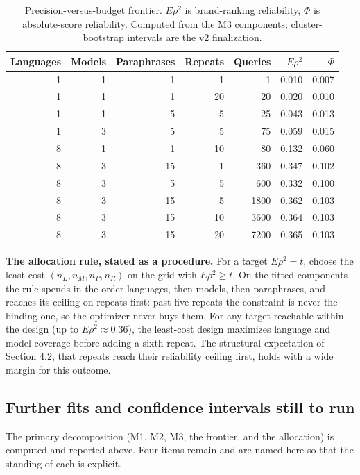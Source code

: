 \documentclass[pdflatex,sn-mathphys-num]{sn-jnl}
\begin{document}
\begin{table}[htbp]
\caption{Precision-versus-budget frontier. $E\rho^2$ is brand-ranking reliability, $\Phi$ is absolute-score reliability. Computed from the M3 components; cluster-bootstrap intervals are the v2 finalization.}
\footnotesize
\begin{tabular*}{\textwidth}{@{\extracolsep{\fill}}rrrrrrr}
\toprule
Languages & Models & Paraphrases & Repeats & Queries & \(E\rho^2\) & \(\Phi\) \\
\midrule

1 & 1 & 1 & 1 & 1 & 0.010 & 0.007 \\
1 & 1 & 1 & 20 & 20 & 0.020 & 0.010 \\
1 & 1 & 5 & 5 & 25 & 0.043 & 0.013 \\
1 & 3 & 5 & 5 & 75 & 0.059 & 0.015 \\
8 & 1 & 1 & 10 & 80 & 0.132 & 0.060 \\
8 & 3 & 15 & 1 & 360 & 0.347 & 0.102 \\
8 & 3 & 5 & 5 & 600 & 0.332 & 0.100 \\
8 & 3 & 15 & 5 & 1800 & 0.362 & 0.103 \\
8 & 3 & 15 & 10 & 3600 & 0.364 & 0.103 \\
8 & 3 & 15 & 20 & 7200 & 0.365 & 0.103 \\
\bottomrule
\end{tabular*}
\end{table}

\textbf{The allocation rule, stated as a procedure.} For a target \(E\rho^2 = t\), choose the least-cost \((n_L,n_M,n_P,n_R)\) on the grid with \(E\rho^2 \geq t\). On the fitted components the rule spends in the order languages, then models, then paraphrases, and reaches its ceiling on repeats first: past five repeats the constraint is never the binding one, so the optimizer never buys them. For any target reachable within the design (up to \(E\rho^2 \approx 0.36\)), the least-cost design maximizes language and model coverage before adding a sixth repeat. The structural expectation of Section 4.2, that repeats reach their reliability ceiling first, holds with a wide margin for this outcome.

\subsection{Further fits and confidence intervals still to run}\label{further-fits-and-confidence-intervals-still-to-run}

The primary decomposition (M1, M2, M3, the frontier, and the allocation) is computed and reported above. Four items remain and are named here so that the standing of each is explicit.
\end{document}
